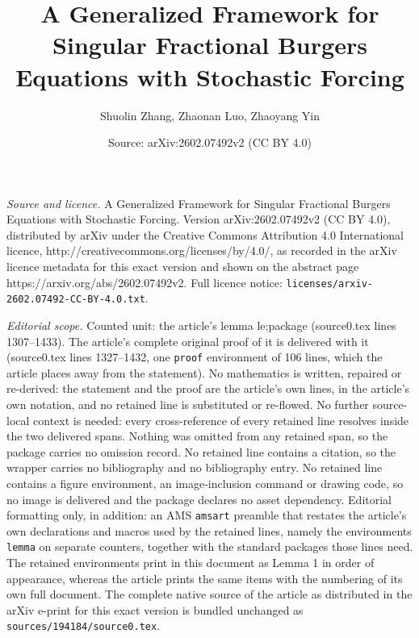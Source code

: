 \documentclass[10pt,a4paper]{amsart}
\title{A Generalized Framework for Singular Fractional Burgers Equations with Stochastic Forcing}
\author{Shuolin Zhang, Zhaonan Luo, Zhaoyang Yin}
\date{Source: arXiv:2602.07492v2 (CC BY 4.0)}
\begin{document}
\maketitle

\noindent\emph{Source and licence.} A Generalized Framework for Singular Fractional Burgers Equations with Stochastic Forcing. Version arXiv:2602.07492v2 (CC BY 4.0), distributed by arXiv under the Creative Commons Attribution 4.0 International licence, http://creativecommons.org/licenses/by/4.0/, as recorded in the arXiv licence metadata for this exact version and shown on the abstract page https://arxiv.org/abs/2602.07492v2. Full licence notice: \texttt{licenses/arxiv-2602.07492-CC-BY-4.0.txt}.\par\smallskip

\noindent\textit{Editorial scope.} Counted unit: the article's lemma le;package (source0.tex lines 1307--1433). The article's complete original proof of it is delivered with it (source0.tex lines 1327--1432, one \texttt{proof} environment of 106 lines, which the article places away from the statement). No mathematics is written, repaired or re-derived: the statement and the proof are the article's own lines, in the article's own notation, and no retained line is substituted or re-flowed.  No further source-local context is needed: every cross-reference of every retained line resolves inside the two delivered spans.  Nothing was omitted from any retained span, so the package carries no omission record.  No retained line contains a citation, so the wrapper carries no bibliography and no bibliography entry.  No retained line contains a figure environment, an image-inclusion command or drawing code, so no image is delivered and the package declares no asset dependency.  Editorial formatting only, in addition: an AMS \texttt{amsart} preamble that restates the article's own declarations and macros used by the retained lines, namely the environments \texttt{lemma} on separate counters, together with the standard packages those lines need.  The retained environments print in this document as Lemma 1 in order of appearance, whereas the article prints the same items with the numbering of its own full document.  The complete native source of the article as distributed in the arXiv e-print for this exact version is bundled unchanged as \texttt{sources/194184/source0.tex}.
\end{document}

